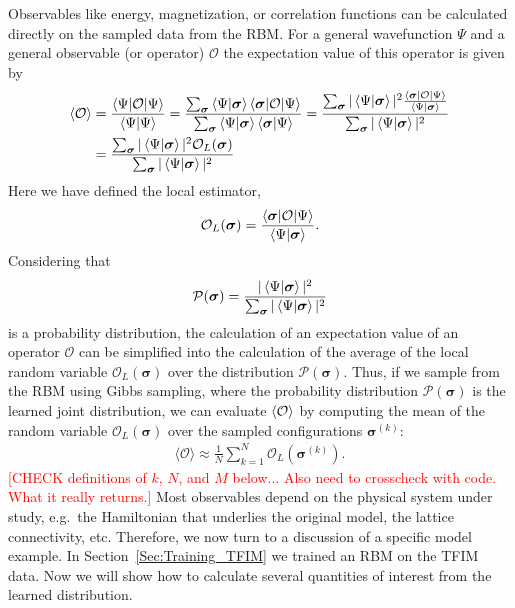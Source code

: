 \documentclass[submission, Phys]{SciPost}
\begin{document}
Observables like energy, magnetization, or correlation functions can be calculated directly on the sampled data from the RBM. 
For a general wavefunction $\Psi$ and a general observable (or operator) $\mathcal{O}$ the expectation value of this operator is given by
\begin{align}
\braket{\mathcal{O}} &= \frac{\braket{\Psi | \mathcal{O} | \Psi}}{\braket{\Psi | \Psi}} = \frac{\sum_{\bm{\sigma}} \braket{\Psi | {\bm{\sigma}}} \braket{{\bm{\sigma}} | \mathcal{O} | \Psi}}{\sum_{\bm{\sigma}} \braket{\Psi | {\bm{\sigma}}} \braket{{\bm{\sigma}} | \Psi}} = \frac{\sum_{\bm{\sigma}} | \braket{\Psi | {\bm{\sigma}}} |^2 \frac{\braket{{\bm{\sigma}} | \mathcal{O} | \Psi}}{\braket{\Psi | {\bm{\sigma}}}} }{\sum_{\bm{\sigma}}  | \braket{\Psi | {\bm{\sigma}}} |^2} \\
&= \frac{\sum_{\bm{\sigma}} | \braket{\Psi | {\bm{\sigma}}} |^2 \mathcal{O}_L({\bm{\sigma}}) }{\sum_{\bm{\sigma}}  | \braket{\Psi | {\bm{\sigma}}} |^2} 
\end{align}
Here we have defined the local estimator,
\begin{equation}
\mathcal{O}_L({\bm{\sigma}}) =  \frac{\braket{{\bm{\sigma}} | \mathcal{O} | \Psi}}{\braket{\Psi | {\bm{\sigma}}}} .
\end{equation}
Considering that
\begin{equation}
\mathcal{P}({\bm{\sigma}}) = \frac{ | \braket{\Psi | {\bm{\sigma}}} |^2  }{\sum_{\bm{\sigma}}  | \braket{\Psi | {\bm{\sigma}}} |^2} 
\end{equation}
is a probability distribution, the calculation of an expectation value of an operator $\mathcal{O}$ can be simplified 
into the calculation of  the average of the local random variable $\mathcal{O}_L({\bm{\sigma}})$ over the distribution $\mathcal{P}({\bm{\sigma}})$.
Thus, if we sample from the RBM using Gibbs sampling, where the probability distribution $\mathcal{P}({\bm{\sigma}})$ is the learned joint distribution,
we can evaluate $\braket{\mathcal{O}}$ by computing the mean of the random variable $\mathcal{O}_L({\bm{\sigma}})$ over the 
sampled configurations ${\bm{\sigma}^{(k)}}$:
\begin{align}
\label{Eq:}
\mathcal{\langle O \rangle} \approx \frac{1}{N} \sum_{k=1}^N \mathcal{O}_L({\bm{\sigma}}^{(k)}).
\end{align}
\textcolor{red}{[CHECK definitions of $k$, $N$, and $M$ below... Also need to crosscheck with code. What it really returns.]}
Most observables depend on the physical system under study, e.g.~the Hamiltonian that underlies the original model, the lattice connectivity, etc. 
Therefore, we now turn to a discussion of a specific model example. In Section~\ref{Sec:Training_TFIM} we trained an RBM on the TFIM data. 
Now we will show how to calculate several quantities of interest from the learned distribution.
\end{document}
